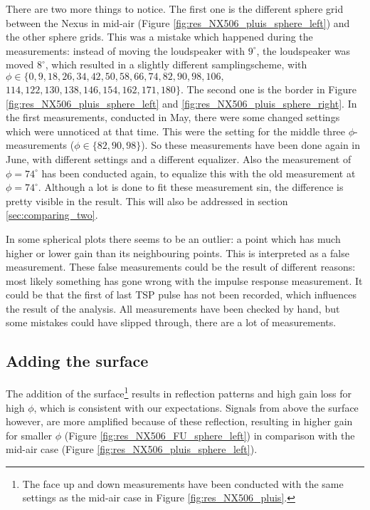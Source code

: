 There are two more things to notice.
The first one is the different sphere grid between the Nexus in mid-air (Figure \ref{fig:res_NX506_pluis_sphere_left}) and the other sphere grids.
This was a mistake which happened during the measurements: instead of moving the loudspeaker with $9^\circ$, the loudspeaker was moved $8^\circ$, which resulted in a slightly different samplingscheme, with $\phi\in\{0,9,18,26,34,42,50,58,66,74,82,90,98,106,$ $114,122,130,138,146,154,162,171,180\}$.
The second one is the border in Figure \ref{fig:res_NX506_pluis_sphere_left} and \ref{fig:res_NX506_pluis_sphere_right}.
In the first measurements, conducted in May, there were some changed settings which were unnoticed at that time.
This were the setting for the middle three $\phi$-measurements ($\phi\in\{82,90,98\}$).
So these measurements have been done again in June, with different settings and a different equalizer.
Also the measurement of $\phi=74^\circ$ has been conducted again, to equalize this with the old measurement at $\phi=74^\circ$.
Although a lot is done to fit these measurement sin, the difference is pretty visible in the result.
This will also be addressed in section \ref{sec:comparing_two}.

In some spherical plots there seems to be an outlier: a point which has much higher or lower gain than its neighbouring points.
This is interpreted as a false measurement.
These false measurements could be the result of different reasons: most likely something has gone wrong with the impulse response measurement.
It could be that the first of last TSP pulse has not been recorded, which influences the result of the {\matlab} analysis.
All measurements have been checked by hand, but some mistakes could have slipped through, there are a lot of measurements.

\subsection{Adding the surface}
The addition of the surface\footnote{The face up and down measurements have been conducted with the same settings as the mid-air case in Figure \ref{fig:res_NX506_pluis}.}
results in reflection patterns and high gain loss for high $\phi$, which is consistent with our expectations.
Signals from above the surface however, are more amplified because of these reflection, resulting in higher gain for smaller $\phi$ (Figure \ref{fig:res_NX506_FU_sphere_left}) in comparison with the mid-air case (Figure \ref{fig:res_NX506_pluis_sphere_left}).


